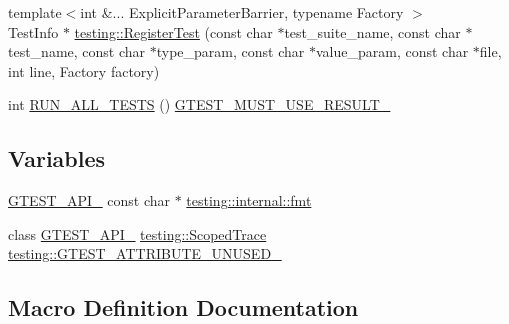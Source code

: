 \begin{DoxyCompactItemize}
\item 
{\footnotesize template$<$int \&... Explicit\+Parameter\+Barrier, typename Factory $>$ }\\Test\+Info $\ast$ \mbox{\hyperlink{namespacetesting_a8b90d759c019a155800afdd4b8d623c3}{testing\+::\+Register\+Test}} (const char $\ast$test\+\_\+suite\+\_\+name, const char $\ast$test\+\_\+name, const char $\ast$type\+\_\+param, const char $\ast$value\+\_\+param, const char $\ast$file, int line, Factory factory)
\item 
int \mbox{\hyperlink{googletest-master_2googletest_2include_2gtest_2gtest_8h_a853a3792807489591d3d4a2f2ff9359f}{R\+U\+N\+\_\+\+A\+L\+L\+\_\+\+T\+E\+S\+TS}} () \mbox{\hyperlink{_obj__test_2lib_2googletest-release-1_88_81_2googletest_2include_2gtest_2internal_2gtest-port_8h_a8e5aab8276b2645f64f41c9e3021b935}{G\+T\+E\+S\+T\+\_\+\+M\+U\+S\+T\+\_\+\+U\+S\+E\+\_\+\+R\+E\+S\+U\+L\+T\+\_\+}}
\end{DoxyCompactItemize}
\subsection*{Variables}
\begin{DoxyCompactItemize}
\item 
\mbox{\hyperlink{_obj__test_2lib_2googletest-release-1_88_81_2googletest_2include_2gtest_2internal_2gtest-port_8h_aa73be6f0ba4a7456180a94904ce17790}{G\+T\+E\+S\+T\+\_\+\+A\+P\+I\+\_\+}} const char $\ast$ \mbox{\hyperlink{namespacetesting_1_1internal_a503360987bcbc4722e1f2e10a14254d8}{testing\+::internal\+::fmt}}
\item 
class \mbox{\hyperlink{_obj__test_2lib_2googletest-release-1_88_81_2googletest_2include_2gtest_2internal_2gtest-port_8h_aa73be6f0ba4a7456180a94904ce17790}{G\+T\+E\+S\+T\+\_\+\+A\+P\+I\+\_\+}} \mbox{\hyperlink{classtesting_1_1_scoped_trace}{testing\+::\+Scoped\+Trace}} \mbox{\hyperlink{namespacetesting_ada49f71f486d52155b86702a570f7fcb}{testing\+::\+G\+T\+E\+S\+T\+\_\+\+A\+T\+T\+R\+I\+B\+U\+T\+E\+\_\+\+U\+N\+U\+S\+E\+D\+\_\+}}
\end{DoxyCompactItemize}


\subsection{Macro Definition Documentation}
\mbox{\label{googletest-master_2googletest_2include_2gtest_2gtest_8h_adc16b5b0a740c39084ea5c9e960e3063}} 
